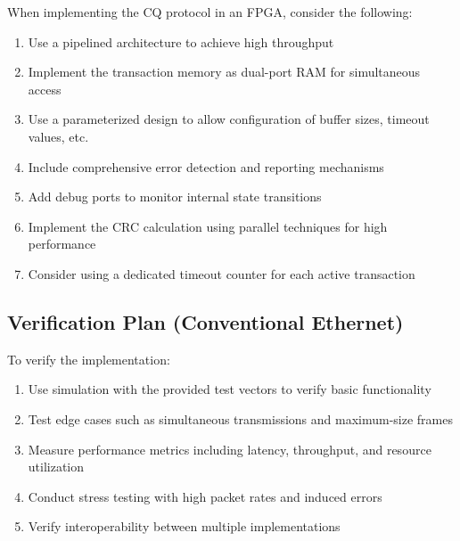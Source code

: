 \documentclass[../../../OAE-SPEC-MAIN.tex]{subfiles}
\begin{document}
When implementing the CQ protocol in an FPGA, consider the following:

\begin{enumerate}
    \item Use a pipelined architecture to achieve high throughput
    \item Implement the transaction memory as dual-port RAM for simultaneous access
    \item Use a parameterized design to allow configuration of buffer sizes, timeout values, etc.
    \item Include comprehensive error detection and reporting mechanisms
    \item Add debug ports to monitor internal state transitions
    \item Implement the CRC calculation using parallel techniques for high performance
    \item Consider using a dedicated timeout counter for each active transaction
\end{enumerate}

\subsection{Verification Plan (Conventional Ethernet)}

To verify the implementation:

\begin{enumerate}
    \item Use simulation with the provided test vectors to verify basic functionality
    \item Test edge cases such as simultaneous transmissions and maximum-size frames
    \item Measure performance metrics including latency, throughput, and resource utilization
    \item Conduct stress testing with high packet rates and induced errors
    \item Verify interoperability between multiple implementations
\end{enumerate}
\end{document}
